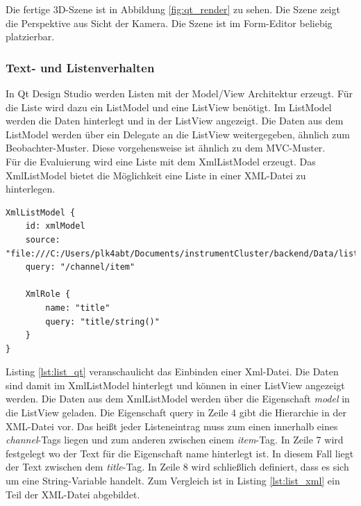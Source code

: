 Die fertige 3D-Szene ist in Abbildung \ref{fig:qt_render} zu sehen. Die Szene zeigt die Perspektive aus Sicht der Kamera. Die Szene ist im Form-Editor beliebig platzierbar.\\

\subsubsection{Text- und Listenverhalten}

In Qt Design Studio werden Listen mit der Model/View Architektur erzeugt. Für die Liste wird dazu ein ListModel und eine ListView benötigt. Im ListModel werden die Daten hinterlegt und in der ListView angezeigt. Die Daten aus dem ListModel werden über ein Delegate an die ListView weitergegeben, ähnlich zum Beobachter-Muster. Diese vorgehensweise ist ähnlich zu dem \ac{MVC}-Muster.\\


Für die Evaluierung wird eine Liste mit dem XmlListModel erzeugt. Das XmlListModel bietet die Möglichkeit eine Liste in einer XML-Datei zu hinterlegen.\\

\newpage

\lstset{language=[5.0]Lua}
\begin{lstlisting}[frame=htrbl, caption={ListBehaviourModel.qml}, label={lst:list_qt}]
XmlListModel {
	id: xmlModel
	source: 																	"file:///C:/Users/plk4abt/Documents/instrumentCluster/backend/Data/listview_xml.xml"
	query: "/channel/item"

	XmlRole {
		name: "title"
		query: "title/string()"
	}
}
\end{lstlisting}

Listing \ref{lst:list_qt} veranschaulicht das Einbinden einer Xml-Datei. Die Daten sind damit im XmlListModel hinterlegt und können in einer ListView angezeigt werden. Die Daten aus dem XmlListModel werden über die Eigenschaft \textit{model} in die ListView geladen. Die Eigenschaft query in Zeile 4 gibt die Hierarchie in der XML-Datei vor. Das heißt jeder Listeneintrag muss zum einen innerhalb eines \textit{channel}-Tags liegen und zum anderen zwischen einem \textit{item}-Tag. In Zeile 7 wird festgelegt wo der Text für die Eigenschaft name hinterlegt ist. In diesem Fall liegt der Text zwischen dem \textit{title}-Tag. In Zeile 8 wird schließlich definiert, dass es sich um eine String-Variable handelt. Zum Vergleich ist in Listing \ref{lst:list_xml} ein Teil der XML-Datei abgebildet.\\

